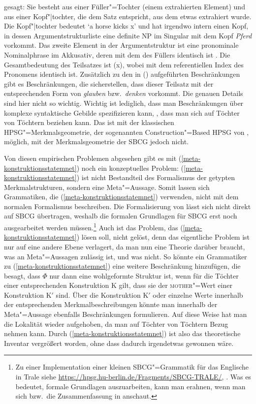 gesagt: Sie besteht aus einer Füller"=Tochter (einem extrahierten Element) und aus einer
Kopf"|tochter, die dem Satz entspricht, aus dem etwas extrahiert wurde. Die Kopf"|tochter bedeutet
`\textrm{a horse kicks x}' und hat irgendwo intern einen Kopf, in dessen Argumentstrukturliste eine definite
NP im Singular mit dem Kopf \emph{Pferd} vorkommt. Das zweite Element in der
Argumentstruktur ist eine pronominale Nominalphrase im Akkusativ, deren \localw mit dem des Füllers
identisch ist . Die Gesamtbedeutung des Teilsatzes ist (x),
wobei  mit dem referentiellen Index des Pronomens identisch ist. Zusätzlich zu den in
() aufgeführten Beschränkungen gibt es Beschränkungen, die sicherstellen, dass dieser
Teilsatz mit der entsprechenden Form von \emph{glauben} bzw.\ \emph{denken} vorkommt. Die genauen
Details sind hier nicht so wichtig. Wichtig ist lediglich, dass man Beschränkungen über komplexe
syntaktische Gebilde spezifizieren kann, \dash, dass man sich auf Töchter von Töchtern beziehen
kann. Das ist mit der klassischen HPSG"=Merkmalsgeometrie, der sogenannten Construction"=Based
HPSG von \citet{Sag97a}, möglich, mit der Merkmalsgeometrie der SBCG jedoch nicht. 

Von diesen empirischen Problemen abgesehen gibt es mit (\ref{meta-konstruktionsstatemnet}) noch ein konzeptuelles Problem:
(\ref{meta-konstruktionsstatemnet}) ist nicht Bestandteil des Formalismus der getypten Merkmalstrukturen, sondern eine
Meta"=Aussage. Somit lassen sich Grammatiken, die (\ref{meta-konstruktionsstatemnet}) verwenden, 
nicht mit dem normalen Formalismus beschreiben. Die Formalisierung von \citet{Richter2004a-u} lässt sich
nicht direkt auf SBCG übertragen, weshalb die formalen Grundlagen für SBCG erst noch
ausgearbeitet werden müssen.\footnote{%
Zu einer Implementation einer kleinen SBCG"=Grammatik für das Englische in Trale siehe
\url{https://hpsg.hu-berlin.de/Fragments/SBCG-TRALE/}, \mytoday. Was es bedeutet, formale Grundlagen
auszuarbeiten, kann man erahnen, wenn man sich  bzw.\ die Zusammenfassung in
 anschaut.
}
Auch ist das Problem, das (\ref{meta-konstruktionsstatemnet}) lösen soll, nicht gelöst, denn
das eigentliche Problem ist nur auf eine andere Ebene verlagert, da man nun eine Theorie
darüber braucht, was an Meta"=Aussagen zulässig ist, und was nicht. So könnte ein Grammatiker zu (\ref{meta-konstruktionsstatemnet})
eine weitere Beschränkung hinzufügen, die besagt, dass $\Phi$ nur dann eine wohlgeformte Struktur
ist, wenn für die Töchter einer entsprechenden Konstruktion K gilt, dass sie der \textsc{mother}"=Wert
einer Konstruktion K$'$ sind. Über die Konstruktion K$'$ oder einzelne Werte innerhalb der entsprechenden
Merkmalbeschreibungen könnte man innerhalb der Meta"=Aussage ebenfalls Beschränkungen formulieren.
Auf diese Weise hat man die Lokalität wieder aufgehoben, da man auf Töchter von Töchtern Bezug nehmen kann.
Durch (\ref{meta-konstruktionsstatemnet}) ist also das theoretische Inventar vergrößert worden,
ohne dass dadurch irgendetwas gewonnen wäre.


